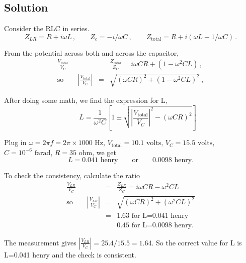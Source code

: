 \documentclass[solutions]{esg8022pset}
\begin{document}
\subsection{Solution}
Consider the RLC in series.
\begin{equation}
Z_{LR}=R+i\omega L\,,\qquad Z_c=-i/\omega C\,,\qquad
Z_{\textrm{total}}=R+i(\omega L-1/\omega C)\,.
\end{equation}

From the potential across both and across the capacitor,
\begin{eqnarray}
\frac{V_{\textrm{total}}}{V_C}&=&\frac{Z_{\textrm{total}}}{Z_C}=i\omega
CR+(1-\omega^2 CL)\,,\\
\textrm{so}\qquad \left| \frac{V_{\textrm{total}}}{V_C}\right| &=&
\sqrt{(\omega CR)^2+(1-\omega^2 CL)^2}\,,
\end{eqnarray}

After doing some math, we find the expression for L,
\begin{equation}
\qquad L = \frac{1}{\omega^2 C}\left[
1\pm \sqrt{\left|\frac{V_{\textrm{total}}}{V_C}\right|^2-(\omega CR)^2}
\right]
\end{equation}

Plug in $\omega=2\pi f=2\pi\times 1000\textrm{ Hz}$,
$V_{\textrm{total}}=10.1\textrm{ volts}$, $V_C=15.5\textrm{ volts}$,
$C=10^{-6}\textrm{ farad}$, $R=35\textrm{ ohm}$, we get
\[ L= 0.041 \textrm{ henry}\qquad\textrm{or}\qquad 0.0098\textrm{ henry}.\]

To check the consistency, calculate the ratio
\begin{eqnarray}
\frac{V_{LR}}{V_C}&=&\frac{Z_{LR}}{Z_C}=i\omega CR-\omega^2 CL\\
\textrm{so}\qquad \left|\frac{V_{LR}}{V_C}\right| &=& \sqrt{(\omega
CR)^2+(\omega^2 CL)^2}\\
&=& 1.63 \textrm{ for L=0.041 henry}\nonumber\\
& & 0.45\textrm{ for L=0.0098 henry}.
\end{eqnarray}

The measurement gives $\left|\frac{V_{LR}}{V_C}\right| =
25.4/15.5=1.64$.  So the correct value for L is L=0.041 henry and the
check is consistent.
\end{document}
